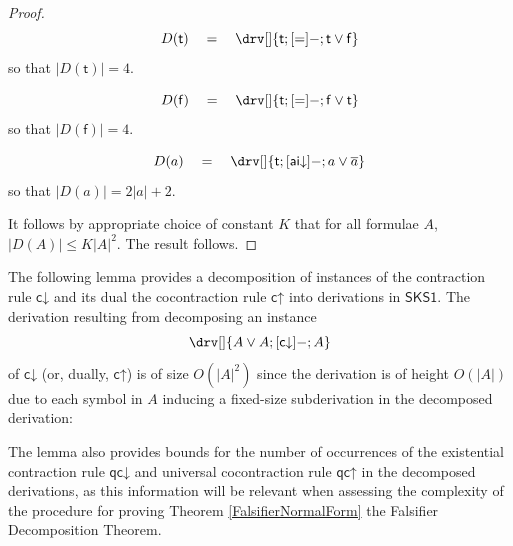 \documentclass[10pt]{article}
\theoremstyle{definition}\newtheorem{remark}[theorem]{Remark}
\theoremstyle{definition}\newtheorem{example}[theorem]{Example}
\theoremstyle{definition}\newtheorem{definition}[theorem]{Definition}
\newcommand{\SKSqDecomp}{{\mathsf{SKS1}}}
\newcommand{\aiDown}{{\mathsf{ai\mathord\downarrow}}}
\newcommand{\cUp}{{\mathsf{c\mathord\uparrow}}}
\newcommand{\cDown}{{\mathsf{c\mathord\downarrow}}}
\newcommand{\qcUp}{{\mathsf{qc\mathord\uparrow}}}
\newcommand{\qcDown}{{\mathsf{qc\mathord\downarrow}}}
\newcommand{\trueUnit}{\mathsf{t}}
\newcommand{\falseUnit}{\mathsf{f}}
\begin{document}
\begin{proof}
		\[
		D(\trueUnit) \hspace{1em} = \hspace{1em} \drv[] {
			\trueUnit ; [=]- ; \trueUnit \lor \falseUnit
		}
		\]
		so that $| D(\trueUnit) | = 4$.
		
		\[
		D(\falseUnit) \hspace{1em} = \hspace{1em} \drv[] {
			\trueUnit ; [=]- ; \falseUnit \lor \trueUnit
		}
		\]
		so that $| D(\falseUnit) | = 4$.
		
		\[
		D(a) \hspace{1em} = \hspace{1em} \drv[] {
			\trueUnit ; [\aiDown]- ; a \lor \overline{a}
		}
		\]
		so that $| D(a) | = 2 | a | + 2$.
		
		It follows by appropriate choice of constant $K$ that for all formulae $A$, $| D(A) | \leq K| A |^2$. The result follows.
	\end{proof}
	
	The following lemma provides a decomposition of instances of the contraction rule $\cDown$ and its dual the cocontraction rule $\cUp$ into derivations in $\SKSqDecomp$. The derivation resulting from decomposing an instance
	\[
	\drv[] {
		A \lor A ; [\cDown]- ; A
	}
	\]
	of $\cDown$ (or, dually, $\cUp$) is of size $O(| A |^2)$ since the derivation is of height $O(| A |)$ due to each symbol in $A$ inducing a fixed-size subderivation in the decomposed derivation:
	\begin{center}
	\end{center}
	The lemma also provides bounds for the number of occurrences of the existential contraction rule $\qcDown$ and universal cocontraction rule $\qcUp$ in the decomposed derivations, as this information will be relevant when assessing the complexity of the procedure for proving Theorem \ref{FalsifierNormalForm} the Falsifier Decomposition Theorem.
	
\end{document}
